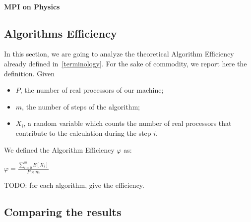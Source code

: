 \paragraph{MPI on Physics}



\subsection{Algorithms Efficiency}
In this section, we are going to analyze the theoretical Algorithm Efficiency already defined in~\ref{terminology}. For the sake of commodity, we report here the definition. Given
\begin{itemize}
\item $P$, the number of real processors of our machine; 
\item $m$, the number of steps of the algorithm;
\item $X_i$, a random variable which counts the number of real processors that contribute to the calculation during the step $i$.
\end{itemize}
We defined the Algorithm Efficiency $\varphi$ as:
\begin{center}
$\varphi = \frac{\sum_{i=0}^m E[X_i]}{P \times m} $
\end{center}
TODO: for each algorithm, give the efficiency.

\subsection{Comparing the results}